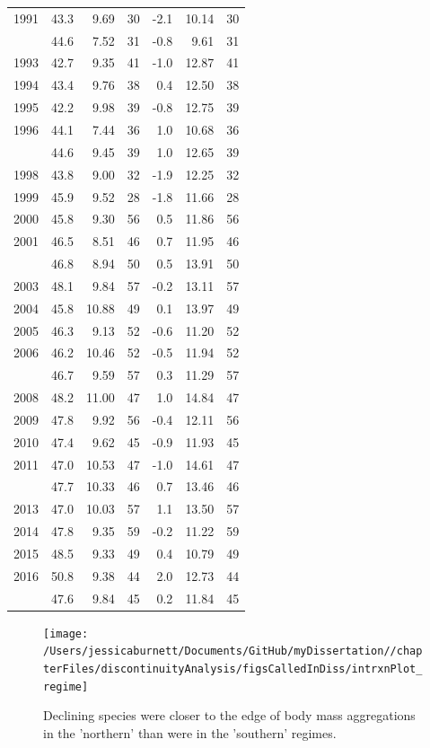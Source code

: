 \documentclass[12pt,twoside,openany]{reedthesis}
\begin{document}
\begin{longtable}{rrrrrrr}
1991 & 43.3 & 9.69 & 30 & -2.1 & 10.14 & 30\\
\addlinespace
1992 & 44.6 & 7.52 & 31 & -0.8 & 9.61 & 31\\
1993 & 42.7 & 9.35 & 41 & -1.0 & 12.87 & 41\\
1994 & 43.4 & 9.76 & 38 & 0.4 & 12.50 & 38\\
1995 & 42.2 & 9.98 & 39 & -0.8 & 12.75 & 39\\
1996 & 44.1 & 7.44 & 36 & 1.0 & 10.68 & 36\\
\addlinespace
1997 & 44.6 & 9.45 & 39 & 1.0 & 12.65 & 39\\
1998 & 43.8 & 9.00 & 32 & -1.9 & 12.25 & 32\\
1999 & 45.9 & 9.52 & 28 & -1.8 & 11.66 & 28\\
2000 & 45.8 & 9.30 & 56 & 0.5 & 11.86 & 56\\
2001 & 46.5 & 8.51 & 46 & 0.7 & 11.95 & 46\\
\addlinespace
2002 & 46.8 & 8.94 & 50 & 0.5 & 13.91 & 50\\
2003 & 48.1 & 9.84 & 57 & -0.2 & 13.11 & 57\\
2004 & 45.8 & 10.88 & 49 & 0.1 & 13.97 & 49\\
2005 & 46.3 & 9.13 & 52 & -0.6 & 11.20 & 52\\
2006 & 46.2 & 10.46 & 52 & -0.5 & 11.94 & 52\\
\addlinespace
2007 & 46.7 & 9.59 & 57 & 0.3 & 11.29 & 57\\
2008 & 48.2 & 11.00 & 47 & 1.0 & 14.84 & 47\\
2009 & 47.8 & 9.92 & 56 & -0.4 & 12.11 & 56\\
2010 & 47.4 & 9.62 & 45 & -0.9 & 11.93 & 45\\
2011 & 47.0 & 10.53 & 47 & -1.0 & 14.61 & 47\\
\addlinespace
2012 & 47.7 & 10.33 & 46 & 0.7 & 13.46 & 46\\
2013 & 47.0 & 10.03 & 57 & 1.1 & 13.50 & 57\\
2014 & 47.8 & 9.35 & 59 & -0.2 & 11.22 & 59\\
2015 & 48.5 & 9.33 & 49 & 0.4 & 10.79 & 49\\
2016 & 50.8 & 9.38 & 44 & 2.0 & 12.73 & 44\\
\addlinespace
2017 & 47.6 & 9.84 & 45 & 0.2 & 11.84 & 45\\
\bottomrule
\end{longtable}
\begin{figure}[bth]

{\centering \texttt{[image: /Users/jessicaburnett/Documents/GitHub/myDissertation//chapterFiles/discontinuityAnalysis/figsCalledInDiss/intrxnPlot\_regime]} 

}

\caption{Declining species were closer to the edge of body mass aggregations in the 'northern' than were in the 'southern' regimes.}\label{fig:intrxnPlot-regime}
\end{figure}
\end{document}
